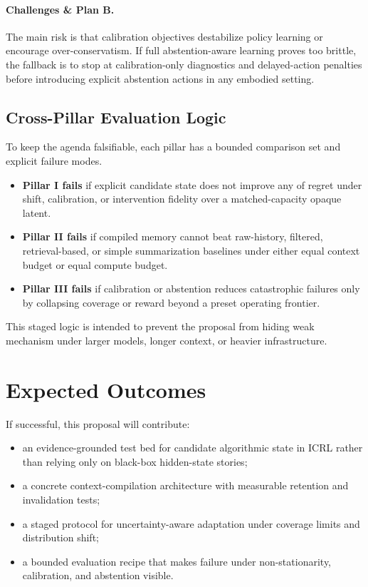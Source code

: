 \documentclass[10pt,twocolumn,letterpaper]{article}
\begin{document}
\paragraph{Challenges \& Plan B.}
The main risk is that calibration objectives destabilize policy learning or encourage over-conservatism. If full abstention-aware learning proves too brittle, the fallback is to stop at calibration-only diagnostics and delayed-action penalties before introducing explicit abstention actions in any embodied setting.

\subsection{Cross-Pillar Evaluation Logic}
To keep the agenda falsifiable, each pillar has a bounded comparison set and explicit failure modes.
\begin{itemize}[leftmargin=1.2em]
\item \textbf{Pillar I fails} if explicit candidate state does not improve any of regret under shift, calibration, or intervention fidelity over a matched-capacity opaque latent.
\item \textbf{Pillar II fails} if compiled memory cannot beat raw-history, filtered, retrieval-based, or simple summarization baselines under either equal context budget or equal compute budget.
\item \textbf{Pillar III fails} if calibration or abstention reduces catastrophic failures only by collapsing coverage or reward beyond a preset operating frontier.
\end{itemize}
This staged logic is intended to prevent the proposal from hiding weak mechanism under larger models, longer context, or heavier infrastructure.

\section{Expected Outcomes}
If successful, this proposal will contribute:
\begin{itemize}[leftmargin=1.2em]
\item an evidence-grounded test bed for candidate algorithmic state in ICRL rather than relying only on black-box hidden-state stories;
\item a concrete context-compilation architecture with measurable retention and invalidation tests;
\item a staged protocol for uncertainty-aware adaptation under coverage limits and distribution shift;
\item a bounded evaluation recipe that makes failure under non-stationarity, calibration, and abstention visible.
\end{itemize}
\end{document}
